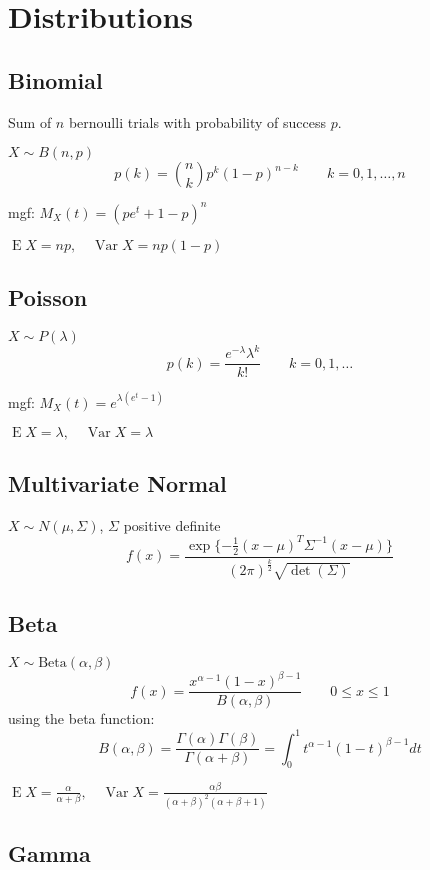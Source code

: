 \documentclass[10pt, twocolumn]{article}
\newcommand{\Expect}{\operatorname{E}}
\newcommand{\Var}{\operatorname{Var}}
\begin{document}
\section{Distributions}

\subsection{Binomial}

Sum of $n$ bernoulli trials with probability of success $p$.

$X \sim B(n, p)$
\[
    p(k) = \binom{n}{k} p^k (1-p)^{n-k}
    \qquad k = 0, 1, \dots, n
\]

mgf: $M_X (t) = (pe^t + 1 - p)^n$

$\Expect X = np, \quad \Var X = np(1-p)$


\subsection{Poisson}

$X \sim P(\lambda)$
\[
    p(k) = \frac{e^{-\lambda} \lambda^k}{k!}
    \qquad k = 0, 1, \dots
\]

mgf: $M_X (t) = e^{\lambda (e^t -1)}$

$\Expect X = \lambda, \quad \Var X = \lambda$


\subsection{Multivariate Normal}

$X \sim N(\mu, \Sigma)$, $\Sigma$ positive definite
\[
    f(x) = \frac{\exp\{ - \frac{1}{2}(x - \mu)^T \Sigma^{-1} (x - \mu) \}}
        {(2\pi)^{\frac{k}{2}} \sqrt{\det(\Sigma)}}
\]

\subsection{Beta}

$ X \sim \text{Beta}(\alpha, \beta)$
\[
    f(x) = \frac{x^{\alpha-1}(1 - x)^{\beta-1}}{B(\alpha, \beta)} 
    \qquad 0 \leq x \leq 1
\]
using the beta function:
\[
    B(\alpha, \beta) =
    \frac{\Gamma(\alpha) \Gamma(\beta)}{\Gamma(\alpha+ \beta)} =
    \int_0^1 t^{\alpha -1} (1-t)^{\beta - 1}dt
\]
    
$\Expect X = \frac{\alpha}{\alpha + \beta},
\quad \Var X = \frac{\alpha \beta}{(\alpha + \beta)^2 (\alpha + \beta + 1)}$

\subsection{Gamma}
\end{document}
